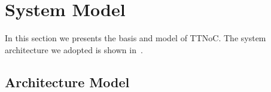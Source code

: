 \documentclass[journal]{IEEEtran}
\begin{document}
%



\section{System Model}
\label{s:model}

In this section we presents the basis and model of TTNoC.
The system architecture we adopted is shown in~\cite{DBLP:conf/rtcsa/PaukovitsK08}. 

\subsection{Architecture Model}
\end{document}

